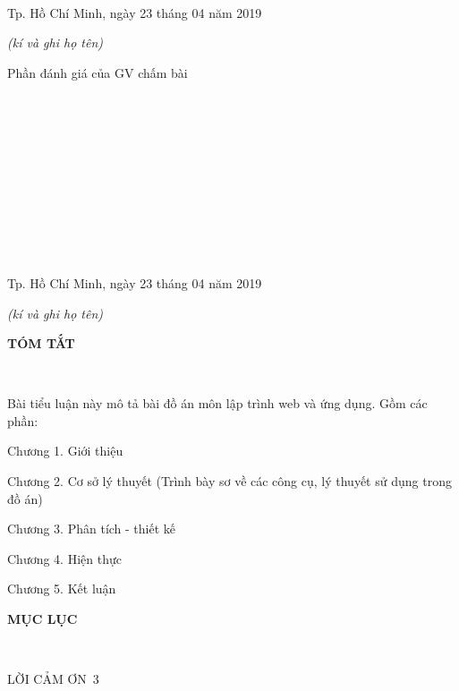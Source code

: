 \documentclass{report}
\begin{document}
\vspace{0.8cm}
\setlength{\parindent}{1cm}
\ \xfill{1pt} \

\bigskip
\ \xfill{1pt} \

\bigskip
\ \xfill{1pt} \

\bigskip
\ \xfill{1pt} \

\bigskip
\ \xfill{1pt} \

\bigskip
\ \xfill{1pt} \

\changefontsizes{12pt}
\setlength{\parindent}{8cm}
Tp. Hồ Chí Minh, ngày 23 tháng 04 năm 2019

\setlength{\parindent}{11cm}
\textit{(kí và ghi họ tên)}

\changefontsizes{13pt}
\vspace{2.5cm}
\setlength{\parindent}{2.2cm}
Phần đánh giá của GV chấm bài

\vspace{0.8cm}
\setlength{\parindent}{1cm}
\ \xfill{1pt} \

\bigskip
\ \xfill{1pt} \

\bigskip
\ \xfill{1pt} \

\bigskip
\ \xfill{1pt} \

\bigskip
\ \xfill{1pt} \

\bigskip
\ \xfill{1pt} \

\changefontsizes{12pt}
\setlength{\parindent}{8cm}
Tp. Hồ Chí Minh, ngày 23 tháng 04 năm 2019

\setlength{\parindent}{11cm}
\textit{(kí và ghi họ tên)}

\newpage
\changefontsizes{16pt}
\centerline{\textbf{TÓM TẮT}}\

\changefontsizes{13pt}
\setlength{\parindent}{2cm}

Bài tiểu luận này mô tả bài đồ án môn lập trình web và ứng dụng. Gồm các phần:

\setlength{\parindent}{2.5cm}
Chương 1. Giới thiệu

Chương 2. Cơ sở lý thuyết (Trình bày sơ về các công cụ, lý thuyết sử dụng trong đồ án)

Chương 3. Phân tích - thiết kế

Chương 4. Hiện thực

Chương 5. Kết luận



\newpage
\changefontsizes{16pt}
\centerline{\textbf{MỤC LỤC}}\

\vspace{1.2cm}
\changefontsizes{14pt}
\setlength{\parindent}{0cm}
LỜI CẢM ƠN\dotfill\ 3
\end{document}
